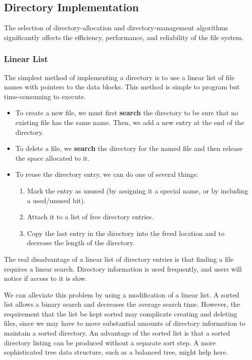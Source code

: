 \subsection{Directory Implementation}\label{subsec:Directory_Implementation}
The selection of directory-allocation and directory-management algorithms significantly affects the efficiency, performance, and reliability of the file system.

\subsubsection{Linear List}\label{subsubsec:Linear_List_Directory}
The simplest method of implementing a directory is to use a linear list of file names with pointers to the data blocks.
This method is simple to program but time-consuming to execute.
\begin{itemize}[noitemsep]
\item To create a new file, we must first \textbf{search} the directory to be sure that no existing file has the same name.
  Then, we add a new entry at the end of the directory.
\item To delete a file, we \textbf{search} the directory for the named file and then release the space allocated to it.
\item To reuse the directory entry, we can do one of several things:
  \begin{enumerate}[noitemsep]
  \item Mark the entry as unused (by assigning it a special name, or by including a used/unused bit).
  \item Attach it to a list of free directory entries.
  \item Copy the last entry in the directory into the freed location and to decrease the length of the directory.
  \end{enumerate}
\end{itemize}

The real disadvantage of a linear list of directory entries is that finding a file requires a linear search.
Directory information is used frequently, and users will notice if access to it is slow.

We can alleviate this problem by using a modification of a linear list.
A sorted list allows a binary search and decreases the average search time.
However, the requirement that the list be kept sorted may complicate creating and deleting files, since we may have to move substantial amounts of directory information to maintain a sorted directory.
An advantage of the sorted list is that a sorted directory listing can be produced without a separate sort step.
A more sophisticated tree data structure, such as a balanced tree, might help here.

